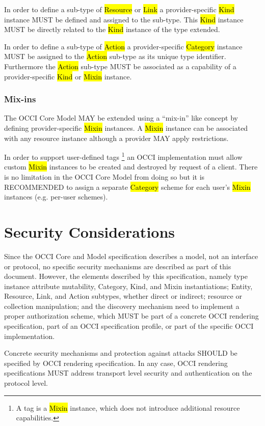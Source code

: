 \documentclass[10pt,a4paper]{article}
\begin{document}
In order to define a sub-type of \hl{Resource} or \hl{Link} a
provider-specific \hl{Kind} instance MUST be defined and assigned to
the sub-type. This \hl{Kind} instance MUST be directly related to the
\hl{Kind} instance of the type extended.

In order to define a sub-type of \hl{Action} a provider-specific
\hl{Category} instance MUST be assigned to the \hl{Action} sub-type as
its unique type identifier.  Furthermore the \hl{Action} sub-type MUST
be associated as a capability of a provider-specific \hl{Kind} or
\hl{Mixin} instance.

\subsubsection{Mix-ins}
The OCCI Core Model MAY be extended using a ``mix-in'' like concept by
defining provider-specific \hl{Mixin} instances.  A \hl{Mixin}
instance can be associated with any resource instance although a
provider MAY apply restrictions.

In order to support user-defined tags%
\footnote{A tag is a \hl{Mixin} instance, which does not introduce
  additional resource capabilities.}
an OCCI implementation must allow custom \hl{Mixin}
instances to be created and destroyed by request of a client.  There
is no limitation in the OCCI Core Model from doing so but it is
RECOMMENDED to assign a separate \hl{Category} scheme for each user's
\hl{Mixin} instances (e.g. per-user schemes).

\section{Security Considerations}
Since the OCCI Core and Model specification describes a model, not an interface
or protocol, no specific security mechanisms are described as part of this
document. However, the elements described by this specification, namely type
instance attribute mutability, Category, Kind, and Mixin instantiations; Entity,
Resource, Link, and Action subtypes,  whether direct or indirect; resource or
collection manipulation; and the discovery mechanism need to implement a proper
authorization scheme, which MUST be part of a concrete OCCI rendering
specification, part of an OCCI specification profile, or part of the specific
OCCI implementation.

Concrete security mechanisms and protection against attacks SHOULD be specified
by OCCI rendering specification. In any case, OCCI rendering specifications MUST
address transport level security and authentication on the protocol level.
\end{document}
